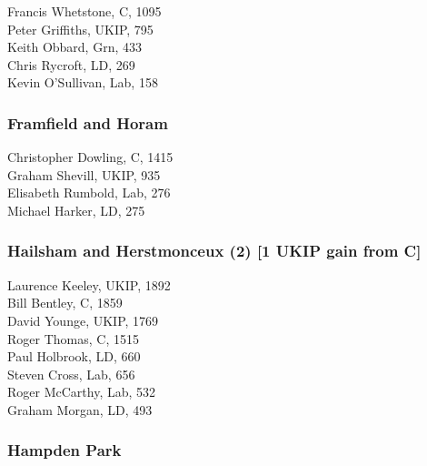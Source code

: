 \documentclass[a4paper,openany,10pt]{book}
\begin{document}


Francis Whetstone, C, 1095\\
Peter Griffiths, UKIP, 795\\
Keith Obbard, Grn, 433\\
Chris Rycroft, LD, 269\\
Kevin O'Sullivan, Lab, 158\\


\subsubsection*{Framfield and Horam}



Christopher Dowling, C, 1415\\
Graham Shevill, UKIP, 935\\
Elisabeth Rumbold, Lab, 276\\
Michael Harker, LD, 275\\


\subsubsection*{Hailsham and Herstmonceux (2) \hspace*{\fill}\nolinebreak[1]%
\enspace\hspace*{\fill}
[1 UKIP gain from C]}



Laurence Keeley, UKIP, 1892\\
Bill Bentley, C, 1859\\
David Younge, UKIP, 1769\\
Roger Thomas, C, 1515\\
Paul Holbrook, LD, 660\\
Steven Cross, Lab, 656\\
Roger McCarthy, Lab, 532\\
Graham Morgan, LD, 493\\


\subsubsection*{Hampden Park}

\end{document}
